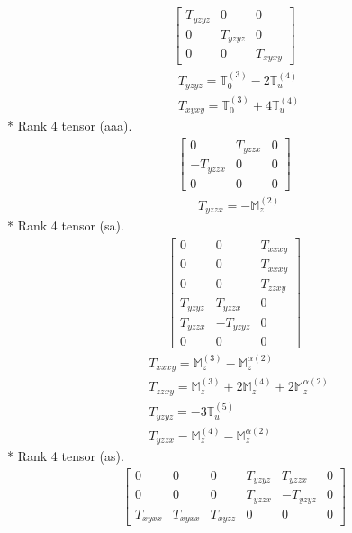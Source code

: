 \documentclass[fleqn,8pt,landscape]{jsarticle}
\begin{document}
\begin{align*}
\begin{bmatrix} T_{yzyz} & 0 & 0 \\ 0 & T_{yzyz} & 0 \\ 0 & 0 & T_{xyxy} \end{bmatrix}
\end{align*}
\begin{align*}
& T_{yzyz} = \mathbb{T}_{0}^{(3)} - 2 \mathbb{T}_{u}^{(4)} \\
& T_{xyxy} = \mathbb{T}_{0}^{(3)} + 4 \mathbb{T}_{u}^{(4)}
\end{align*}
* Rank 4 tensor (aaa).
\begin{align*}
\begin{bmatrix} 0 & T_{yzzx} & 0 \\ - T_{yzzx} & 0 & 0 \\ 0 & 0 & 0 \end{bmatrix}
\end{align*}
\begin{align*}
& T_{yzzx} = - \mathbb{M}_{z}^{(2)}
\end{align*}
* Rank 4 tensor (sa).
\begin{align*}
\begin{bmatrix} 0 & 0 & T_{xxxy} \\ 0 & 0 & T_{xxxy} \\ 0 & 0 & T_{zzxy} \\ T_{yzyz} & T_{yzzx} & 0 \\ T_{yzzx} & - T_{yzyz} & 0 \\ 0 & 0 & 0 \end{bmatrix}
\end{align*}
\begin{align*}
& T_{xxxy} = \mathbb{M}_{z}^{(3)} - \mathbb{M}_{z}^{\alpha(2)} \\
& T_{zzxy} = \mathbb{M}_{z}^{(3)} + 2 \mathbb{M}_{z}^{(4)} + 2 \mathbb{M}_{z}^{\alpha(2)} \\
& T_{yzyz} = - 3 \mathbb{T}_{u}^{(5)} \\
& T_{yzzx} = \mathbb{M}_{z}^{(4)} - \mathbb{M}_{z}^{\alpha(2)}
\end{align*}
* Rank 4 tensor (as).
\begin{align*}
\begin{bmatrix} 0 & 0 & 0 & T_{yzyz} & T_{yzzx} & 0 \\ 0 & 0 & 0 & T_{yzzx} & - T_{yzyz} & 0 \\ T_{xyxx} & T_{xyxx} & T_{xyzz} & 0 & 0 & 0 \end{bmatrix}
\end{align*}
\end{document}
